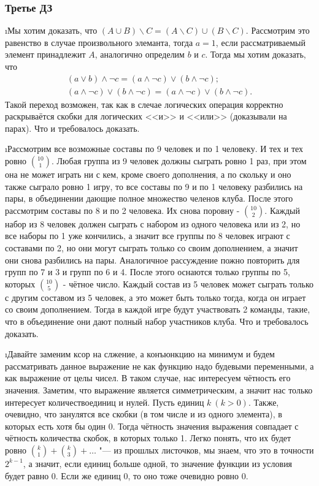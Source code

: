 \subsubsection{Третье ДЗ}

\i Мы хотим доказать, что $(A \cup B) \backslash C = (A \backslash C) \cup (B \backslash C)$. Рассмотрим это равенство в случае произвольного элеманта, тогда $a = 1$, если рассматриваемый элемент принадлежит $A$, аналогично определим $b$ и $c$. Тогда мы хотим доказать, что 
\begin{gather*}
    (a \vee b) \wedge \neg c = (a \wedge \neg c) \vee (b \wedge \neg c);\\
    (a \wedge \neg c) \vee (b \wedge \neg c) = (a \wedge \neg c) \vee (b \wedge \neg c).
\end{gather*}
Такой переход возможен, так как в слечае логических операция корректно раскрываётся скобки для логических <<и>> и <<или>> (доказывали на парах). Что и требовалось доказать.

\i Рассмотрим все возможные составы по 9 человек и по 1 человеку. И тех и тех ровно $\binom{10}{1}$. Любая группа из 9 человек должны сыграть ровно 1 раз, при этом она не может играть ни с кем, кроме своего дополнения, а по скольку и оно также сыграло ровно 1 игру, то все составы по 9 и по 1 человеку разбились на пары, в объединении дающие полное множество челенов клуба. После этого рассмотрим составы по 8 и по 2 человека. Их снова поровну - $\binom{10}{2}$. Каждый набор из 8 человек должен сыграть с набором из одного человека или из 2, но все наборы по 1 уже кончились, а значит все группы по 8 человек играют с составами по 2, но они могут сыграть только со своим дополнением, а значит они снова разбились на пары. Аналогичное рассуждение пожно повторить для групп по 7 и 3 и групп по 6 и 4. После этого оснаются только группы по 5, которых $\binom{10}{5}$ - чётное число. Каждый состав из 5 человек может сыграть только с другим составом из 5 человек, а это может быть только тогда, когда он играет со своим дополнением. Тогда в каждой игре будут участвовать 2 команды, такие, что в объединение они дают полный набор участников клуба. Что и требовалось доказать.

\i Давайте заменим ксор на слжение, а конъюнкцию на минимум и будем рассматривать данное выражение не как функцию надо будевыми переменными, а как выражение от целы чисел. В таком случае, нас интересуем чётность его значения. Заметим, что выражение является симметрическим, а значит нас только интересует количествоединиц и нулей. Пусть единиц $k \ (k > 0)$. Также, очевидно, что занулятся все скобки (в том числе и из одного элемента), в которых есть хотя бы один 0. Тогда чётность значения выражения совпадает с чётность количества скобок, в которых только 1. Легко понять, что их будет ровно $\binom{k}{1} + \binom{k}{3} + \ldots$ "--- из прошлых листочков, мы знаем, что это в точности $2^{k-1}$, а значит, если единиц больше одной, то значение функции из условия будет равно 0. Если же единиц 0, то оно тоже очевидно ровно 0.

